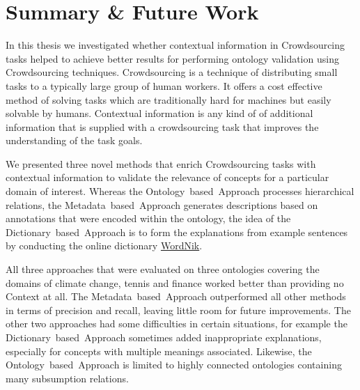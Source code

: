 \chapter{Summary \& Future Work}\label{chap:summary_and_future_work}





In this thesis we investigated whether contextual information in Crowdsourcing tasks helped to achieve better results for performing ontology validation using Crowdsourcing techniques. Crowdsourcing is a technique of distributing small tasks to a typically large group of human workers. It offers a cost effective method of solving tasks which are traditionally hard for machines but easily solvable by humans. Contextual information is any kind of of additional information that is supplied with a crowdsourcing task that improves the understanding of the task goals.

We presented three novel methods that enrich Crowdsourcing tasks with contextual information to validate the relevance of concepts for a particular domain of interest. Whereas the Ontology~based~Approach processes hierarchical relations, the Metadata~based~Approach generates descriptions based on annotations that were encoded within the ontology, the idea of the Dictionary~based~Approach is to form the explanations from example sentences by conducting the online dictionary \hyperref[sec:wordnik]{WordNik}.

All three approaches that were evaluated on three ontologies covering the domains of climate change, tennis and finance worked better than providing no Context at all. The Metadata~based~Approach outperformed all other methods in terms of precision and recall, leaving little room for future improvements. The other two approaches had some difficulties in certain situations, for example the Dictionary~based~Approach sometimes added inappropriate explanations, especially for concepts with multiple meanings associated. Likewise, the Ontology~based~Approach is limited to highly connected ontologies containing many subsumption relations. 

